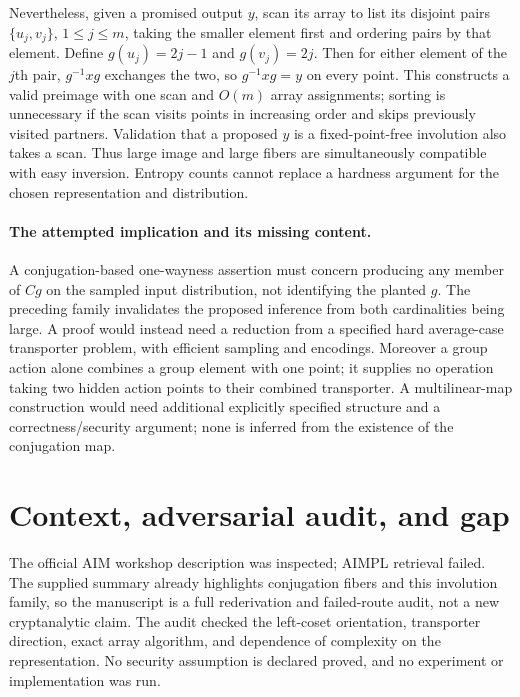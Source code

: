 \documentclass[11pt]{article}
\begin{document}
Nevertheless, given a promised output $y$, scan its array to list its disjoint
pairs $\{u_j,v_j\}$, $1\le j\le m$, taking the smaller element first and
ordering pairs by that element. Define $g(u_j)=2j-1$ and $g(v_j)=2j$.
Then for either element of the $j$th pair, $g^{-1}xg$ exchanges the two, so
$g^{-1}xg=y$ on every point. This constructs a valid preimage with one scan
and $O(m)$ array assignments; sorting is unnecessary if the scan visits points
in increasing order and skips previously visited partners. Validation that
a proposed $y$ is a fixed-point-free involution also takes a scan.
Thus large image and large fibers are simultaneously compatible with easy
inversion. Entropy counts cannot replace a hardness argument for the chosen
representation and distribution.

\paragraph{The attempted implication and its missing content.}
A conjugation-based one-wayness assertion must concern producing any member
of $Cg$ on the sampled input distribution, not identifying the planted $g$.
The preceding family invalidates the proposed inference from both cardinalities
being large. A proof would instead need a reduction from a specified hard
average-case transporter problem, with efficient sampling and encodings.
Moreover a group action alone combines a group element with one point; it
supplies no operation taking two hidden action points to their combined
transporter. A multilinear-map construction would need additional explicitly
specified structure and a correctness/security argument; none is inferred
from the existence of the conjugation map.

\section{Context, adversarial audit, and gap}
The official AIM workshop description was inspected; AIMPL retrieval failed.
The supplied summary already highlights conjugation fibers and this involution
family, so the manuscript is a full rederivation and failed-route audit, not
a new cryptanalytic claim. The audit checked the left-coset orientation,
transporter direction, exact array algorithm, and dependence of complexity
on the representation. No security assumption is declared proved, and no
experiment or implementation was run.
\end{document}
